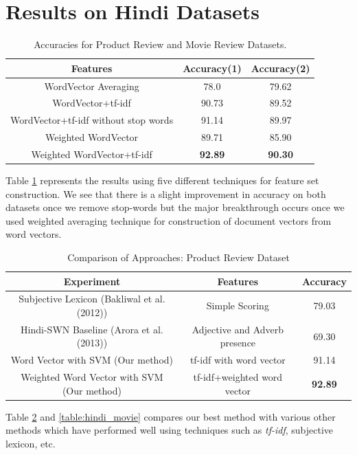\documentclass[11pt,a4paper]{article}
\begin{document}
\section{Results on Hindi Datasets}
\label{sec:hindi_results}
\begin {table}[h!]
\centering
\small
\begin{tabular}{ | c | c | c | }
\hline
\textbf{Features} & \textbf{Accuracy(1)} & \textbf{Accuracy(2)} \\ \hline
WordVector Averaging & 78.0 & 79.62\\ \hline
WordVector+tf-idf & 90.73 & 89.52\\ \hline
WordVector+tf-idf without stop words & 91.14 & 89.97\\ \hline
Weighted WordVector & 89.71 & 85.90\\ \hline
Weighted WordVector+tf-idf & \textbf{92.89} & \textbf{90.30}\\ \hline
\end{tabular}
\caption {Accuracies for Product Review and Movie Review Datasets.}
\label{table:hindi_ourmethods}
\end{table}

Table \ref{table:hindi_ourmethods} represents the results using five different techniques for feature set construction. We see that there is a slight improvement in accuracy on both datasets once we remove stop-words but the major breakthrough occurs once we used weighted averaging technique for construction of document vectors from word vectors.

\begin {table}[h!]
\centering
\small
\begin{tabular}{ | c | c | c | }
\hline
\textbf{Experiment} & \textbf{Features} & \textbf{Accuracy} \\ \hline
Subjective Lexicon (Bakliwal et al.(2012)) & Simple Scoring & 79.03\\ \hline
Hindi-SWN Baseline (Arora et al.(2013)) & Adjective and Adverb presence & 69.30\\ \hline
Word Vector with SVM (Our method) & tf-idf with word vector & 91.14\\ \hline
Weighted Word Vector with SVM (Our method) & tf-idf+weighted word vector & \textbf{92.89}\\ \hline
\end{tabular}
\caption {Comparison of Approaches: Product Review Dataset}
\label{table:hindi_product}
\end{table}
Table \ref{table:hindi_product} and \ref{table:hindi_movie} compares our best method with various other methods which have performed well using techniques such as \emph{tf-idf}, subjective lexicon, etc.
\end{document}
